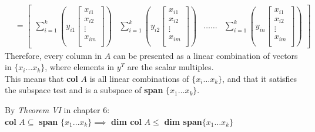 \documentclass[10pt]{article}
\begin{document}
{{{{\begin{spacing}{1.5}
\begin{center}
\begin{align*}
        &=
        \begin{bmatrix}
            \sum_{i=1}^k
            \left(
            y_{i1}
            \begin{bmatrix}
            x_{i1  }\\
            x_{i2  }\\
            \vdots\\
            x_{im  }\\
            \end{bmatrix}
            \right)
            &
            \sum_{i=1}^k
            \left(
            y_{i2}
            \begin{bmatrix}
            x_{i1  }\\
            x_{i2  }\\
            \vdots\\
            x_{im  }\\
            \end{bmatrix}
            \right)
            &
            \dots\dots
            &
            \sum_{i=1}^k
            \left(
            y_{in}
            \begin{bmatrix}
            x_{i1  }\\
            x_{i2  }\\
            \vdots\\
            x_{im  }\\
            \end{bmatrix}
            \right)
        \end{bmatrix}
        \end{align*}
        Therefore, every column in $A$ can be presented as a linear combination of vectors in $\{x_i\dots x_k\}$, where elements in $y^T$ are the scalar multiples.\\
        This means that \textbf{col} $A$ is all linear combinations of $\{x_i\dots x_k\}$, and that it satisfies the subspace test and is a subspace of \textbf{span} $\{x_1\dots x_k\}$.\\
        \begin{spacing}{3}
        \end{spacing}
        By \textit{Theorem VI} in chapter 6:\\
        \textbf{col} $A\subseteq$ \textbf{span} $\{x_1\dots x_k\}\implies$ \textbf{dim col} $A\leq$ \textbf{dim span}$\{x_1\dots x_k\}$\\
        \begin{spacing}{3}
        \end{spacing}

\end{center}
\end{spacing}}}}}
\end{document}
